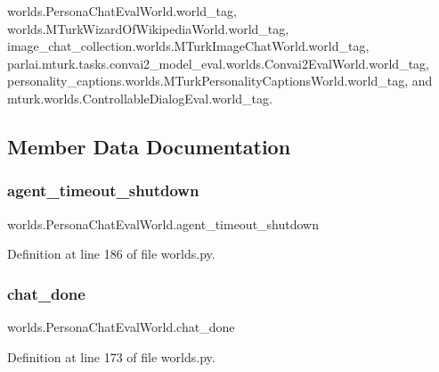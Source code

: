 worlds.\+Persona\+Chat\+Eval\+World.\+world\+\_\+tag, worlds.\+M\+Turk\+Wizard\+Of\+Wikipedia\+World.\+world\+\_\+tag, image\+\_\+chat\+\_\+collection.\+worlds.\+M\+Turk\+Image\+Chat\+World.\+world\+\_\+tag, parlai.\+mturk.\+tasks.\+convai2\+\_\+model\+\_\+eval.\+worlds.\+Convai2\+Eval\+World.\+world\+\_\+tag, personality\+\_\+captions.\+worlds.\+M\+Turk\+Personality\+Captions\+World.\+world\+\_\+tag, and mturk.\+worlds.\+Controllable\+Dialog\+Eval.\+world\+\_\+tag.



\subsection{Member Data Documentation}
\mbox{\label{classworlds_1_1PersonaChatEvalWorld_aee0fa9efee57a370499a0691950b548b}} 
\subsubsection{\texorpdfstring{agent\+\_\+timeout\+\_\+shutdown}{agent\_timeout\_shutdown}}
{\footnotesize\ttfamily worlds.\+Persona\+Chat\+Eval\+World.\+agent\+\_\+timeout\+\_\+shutdown}



Definition at line 186 of file worlds.\+py.

\mbox{\label{classworlds_1_1PersonaChatEvalWorld_a3b39b5c509f4ce9d47dab0789ca9abe5}} 
\subsubsection{\texorpdfstring{chat\+\_\+done}{chat\_done}}
{\footnotesize\ttfamily worlds.\+Persona\+Chat\+Eval\+World.\+chat\+\_\+done}



Definition at line 173 of file worlds.\+py.



